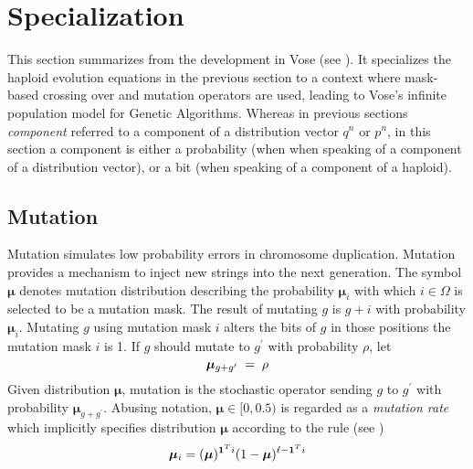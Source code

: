 \section{Specialization}\label{specialize}
This section summarizes from the development in Vose (see \cite{Vose1999}).
It specializes the haploid evolution equations in the previous section 
to a context where mask-based crossing over and mutation operators are used, 
leading to Vose's infinite population model for Genetic Algorithms.  Whereas 
in previous sections {\em component} referred to a component
of a distribution vector $q^n$ or $p^n$, in this section a component
is either a probability (when when speaking of a component of a
distribution vector), or a bit (when speaking of a component of a
haploid).

\subsection{Mutation}
Mutation simulates low probability errors in chromosome duplication. 
Mutation provides a mechanism to inject new strings into the next generation.
The symbol $\bm{\mu}$ denotes mutation distribution describing 
the probability $\bm{\mu}_i$ with which $i \in \Omega$ is selected to be a mutation mask. 
The result of mutating $g$ is $g + i$ with probability $\bm{\mu}_i$. 
Mutating $g$ using mutation mask $i$ alters the bits of $g$ in those positions the mutation mask $i$ is 1. 
If $g$ should mutate to $g^\prime$ with probability $\rho$,
let\\[-0.2in]
\[
\bm{\mu}_{g + g^\prime} \; = \; \rho\\[0.05in]
\]
Given distribution $\bm{\mu}$, mutation is the stochastic operator sending
$g$ to $g^\prime$ with probability $\bm{\mu}_{g + g^\prime}$.
Abusing notation, $\bm{\mu} \in [0, 0.5)$ is regarded as a {\em mutation rate} which implicitly 
specifies distribution $\bm{\mu}$ according to the rule (see \cite{VoseWright1998})
\[
\bm{\mu}_i = (\bm{\mu})^{{\bf 1}^Ti} (1-\bm{\mu})^{\ell- {\bf 1}^Ti}
\]

